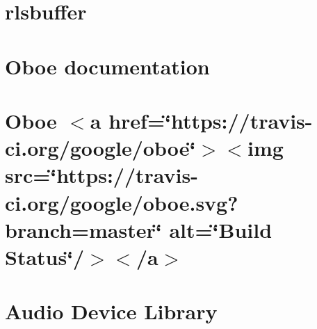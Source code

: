 \let\mypdfximage\pdfximage\def\pdfximage{\immediate\mypdfximage}\documentclass[twoside]{book}
\newcommand{\+}{\discretionary{\mbox{\scriptsize$\hookleftarrow$}}{}{}}
\begin{document}
\chapter{rlsbuffer}
\label{md__c_1__users_fab_src__github_branches__neural_amp_modeler_plugin_i_plug2__dependencies__build_1ad5786b78763edd507011642ee72530}

\chapter{Oboe documentation}
\label{md__c_1__users_fab_src__github_branches__neural_amp_modeler_plugin_i_plug2__dependencies__build_a80572b009381ce822a1e87bc15090d8}

\chapter{Oboe $<$a href=\char`\"{}https\+://travis-\/ci.\+org/google/oboe\char`\"{}$>$$<$img src=\char`\"{}https\+://travis-\/ci.\+org/google/oboe.\+svg?branch=master\char`\"{} alt=\char`\"{}\+Build Status\char`\"{}/$>$$<$/a$>$}
\label{md__c_1__users_fab_src__github_branches__neural_amp_modeler_plugin_i_plug2__dependencies__build_145f01483117948e79a353ec1e74628e}

\chapter{Audio Device Library}
\label{md__c_1__users_fab_src__github_branches__neural_amp_modeler_plugin_i_plug2__dependencies__build_f306333db4d97fafc6901002d63f36b9}

\end{document}
